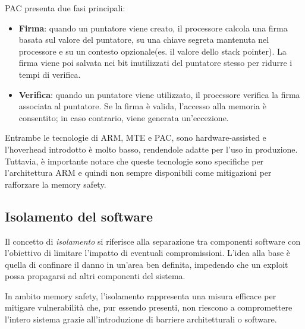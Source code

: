 PAC presenta due fasi principali:
\begin{itemize}
  \item \textbf{Firma}: quando un puntatore viene creato, il processore calcola
    una firma basata sul valore del puntatore, su una chiave segreta mantenuta nel
    processore e su un contesto opzionale(es. il valore dello stack pointer). La
    firma viene poi salvata nei bit inutilizzati del puntatore stesso per
    ridurre i tempi di verifica.

  \item \textbf{Verifica}: quando un puntatore viene utilizzato, il processore
    verifica la firma associata al puntatore. Se la firma è valida, l'accesso
    alla memoria è consentito; in caso contrario, viene generata un'eccezione.
\end{itemize}

\bigskip
\noindent
Entrambe le tecnologie di ARM, MTE e PAC, sono hardware-assisted e l'hoverhead introdotto
è molto basso, rendendole adatte per l'uso in produzione. Tuttavia, è importante
notare che queste tecnologie sono specifiche per l'architettura ARM e quindi non
sempre disponibili come mitigazioni per rafforzare la memory safety.

\subsection{Isolamento del software}
\label{sec:isolation}

Il concetto di \textit{isolamento} si riferisce alla separazione tra componenti
software con l'obiettivo di limitare l'impatto di eventuali compromissioni. L'idea
alla base è quella di confinare il danno in un'area ben definita, impedendo che
un exploit possa propagarsi ad altri componenti del sistema.

In ambito memory safety, l'isolamento rappresenta una misura efficace per mitigare
vulnerabilità che, pur essendo presenti, non riescono a compromettere l'intero sistema
grazie all'introduzione di barriere architetturali o software.

